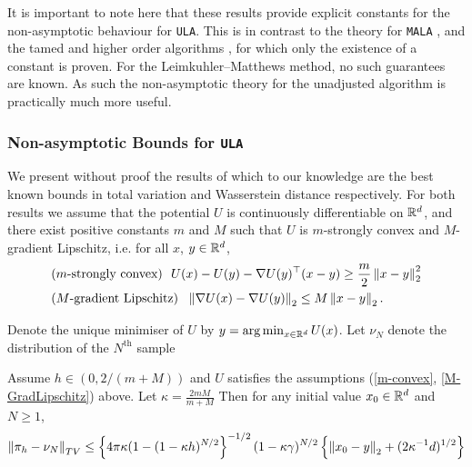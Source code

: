 It is important to note here that these results provide explicit constants for the non-asymptotic behaviour for \texttt{ULA}.  This is in contrast to the theory for \texttt{MALA} \cite{bou2013nonasymptotic}, and the tamed \cite{Brosse18tULA} and higher order algorithms \cite{Sabanis18tHOLA}, for which only the existence of a constant is proven.  For the Leimkuhler--Matthews method, no such guarantees are known.  As such the non-asymptotic theory for the unadjusted algorithm is practically much more useful.

\subsubsection{Non-asymptotic Bounds for \texttt{ULA}}
We present without proof the results of \cite{durmus2017nonasymptotic, dalalyan2019user} which to our knowledge are the best known bounds in total variation and Wasserstein distance respectively. For both results we assume that the potential $U$ is continuously differentiable on $\mathbb{R}^d$, and there exist positive constants $m$ and $M$ such that $U$ is $m$-strongly convex and $M$-gradient Lipschitz, i.e. for all $x$, $y \in \mathbb{R}^d$,
\begin{align} \label{m-convex}
    &\text{($m$-strongly convex) \ } U(x) - U(y) - \grad U(y)^\top (x - y) \geq \frac{m}{2}\norm{x-y}_2^2\\
    &\text{($M$-gradient Lipschitz) \ } \norm{\grad U(x) - \grad U(y)}_2 \leq M \norm{x-y}_2. \label{M-GradLipschitz}
\end{align}

Denote the unique minimiser of $U$ by $y=\arg \min_{x \in \mathbb{R}^d} U(x)$.  Let $\nu_N$ denote the distribution of the $N^{\text{th}}$ sample

\begin{theorem}
    Assume $h \in (0, 2/(m+M))$ and $U$ satisfies the assumptions (\ref{m-convex}, \ref{M-GradLipschitz}) above.  Let $\kappa = \frac{2mM}{m+M}$  Then for any initial value $x_0 \in \mathbb{R}^d$ and $N \geq 1$,
    $$
    \norm{\pi_h - \nu_N}_{TV} \leq \left\{ 4 \pi \kappa (1-(1-\kappa h)^{N/2} \right\}^{-1/2} (1-\kappa \gamma)^{N/2} \left\{ \norm{x_0 - y}_2 + (2 \kappa^{-1}d)^{1/2} \right\}
    $$
\end{theorem}

